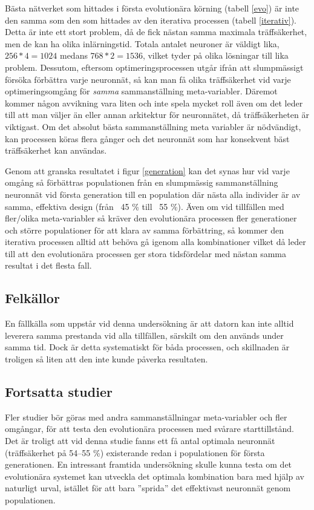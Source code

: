 \documentclass[a4paper, 12pt]{article}
\begin{document}
    Bästa nätverket som hittades i första evolutionära körning (tabell \ref{evo}) är inte den samma som den som hittades av den iterativa processen (tabell \ref{iterativ}). Detta är inte ett stort problem, då de fick nästan samma maximala träffsäkerhet, men de kan ha olika inlärningstid. Totala antalet neuroner är väldigt lika, $256 * 4 = 1024$ medans $768 * 2 = 1536$, vilket tyder på olika lösningar till lika problem. Dessutom, eftersom optimeringsprocessen utgår ifrån att slumpmässigt försöka förbättra varje neuronnät, så kan man få olika träffsäkerhet vid varje optimeringsomgång för \textit{samma} sammanställning meta-variabler. Däremot kommer någon avvikning vara liten och inte spela mycket roll även om det leder till att man väljer än eller annan arkitektur för neuronnätet, då träffsäkerheten är viktigast. Om det absolut bästa sammanställning meta variabler är nödvändigt, kan processen köras flera gånger och det neuronnät som har konsekvent bäst träffsäkerhet kan användas.

    Genom att granska resultatet i figur \ref{generation} kan det synas hur vid varje omgång så förbättras populationen från en slumpmässig sammanställning neuronnät vid första generation till en population där nästa alla individer är av samma, effektiva design (från ~45 \% till ~55 \%). Även om vid tillfällen med fler/olika meta-variabler så kräver den evolutionära processen fler generationer och större populationer för att klara av samma förbättring, så kommer den iterativa processen alltid att behöva gå igenom alla kombinationer vilket då leder till att den evolutionära processen ger stora tidsfördelar med nästan samma resultat i det flesta fall.


  \subsection{Felkällor}

  En fällkälla som uppstår vid denna undersökning är att datorn kan inte alltid leverera samma prestanda vid alla tillfällen, särskilt om den används under samma tid. Dock är detta systematiskt för båda processen, och skillnaden är troligen så liten att den inte kunde påverka resultaten.

  \subsection{Fortsatta studier}

  Fler studier bör göras med andra sammanställningar meta-variabler och fler omgångar, för att testa den evolutionära processen med svårare starttillstånd. Det är troligt att vid denna studie fanns ett få antal optimala neuronnät (träffsäkerhet på 54–55 \%) existerande redan i populationen för första generationen. En intressant framtida undersökning skulle kunna testa om det evolutionära systemet kan utveckla det optimala kombination bara med hjälp av naturligt urval, istället för att bara ”sprida” det effektivast neuronnät genom populationen.
\end{document}
